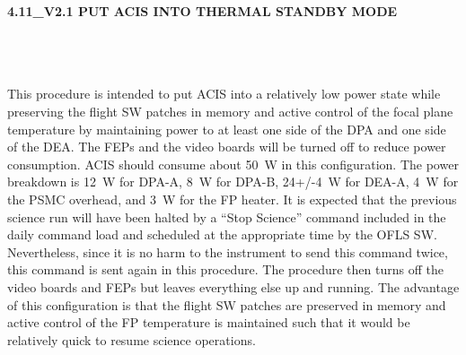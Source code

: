 \documentclass[11pt]{article}
\begin{document}
%
%
%
\newcommand{\be}{\begin{enumerate}}
\newcommand{\ee}{\end{enumerate}}
\newcommand{\bc}{\begin{center}}
\newcommand{\ec}{\end{center}}
\newcommand{\bi}{\begin{itemize}}
\newcommand{\ei}{\end{itemize}}
\newcommand{\bd}{\begin{description}}
\newcommand{\ed}{\end{description}}
\newcommand{\bt}{\begin{tabbing}}
\newcommand{\et}{\end{tabbing}}
\newcommand{\eg}{{\it e.g.~}}
\newcommand{\ie}{{\it i.e.~}}
\newcommand{\ul}{\underline}
\newcommand{\axaf}{{\em AXAF}}
\newcommand*\red{\color{red}}
\newcommand*\blue{\color{blue}}
\def\la{\hbox{\rlap{$<$}\lower0.5ex\hbox{$\sim$}\ }}


\large
\centerline {\bf 4.11\_V2.1 PUT ACIS INTO THERMAL STANDBY MODE } 
\vspace{0.25in}

\normalsize
{}\\
 \\


 \\

This procedure is intended to put ACIS into a relatively low 
power state while preserving the flight SW patches in memory and 
active control of the focal plane temperature by maintaining power 
to at least one side of the DPA and one side of the DEA. The FEPs 
and the video boards will be turned off to reduce power consumption. 
ACIS should consume about 50~W in this configuration. The power 
breakdown is 12~W for DPA-A, 8~W for DPA-B, 24+/-4~W for DEA-A, 
4~W for the PSMC overhead, and 3~W for the FP heater. It is expected 
that the previous science run will have been halted by a ``Stop Science'' 
command included in the daily command load and scheduled at the appropriate 
time by the OFLS SW. Nevertheless, since it is no harm to the instrument 
to send this command twice, this command is sent again in this procedure. 
The procedure then turns off the video boards and FEPs but leaves everything 
else up and running. The advantage of this configuration is that the 
flight SW patches are preserved in memory and active control of the FP 
temperature is maintained such that it would be relatively quick to resume 
science operations.
\end{document}
